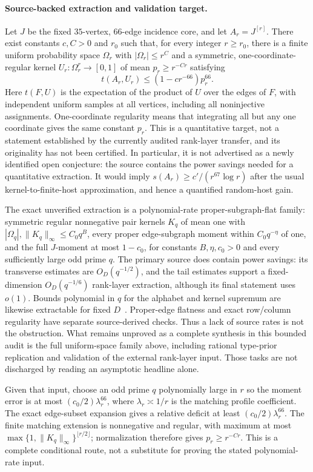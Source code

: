 \paragraph{Source-backed extraction and validation target.}
Let $J$ be the fixed $35$-vertex, $66$-edge incidence core, and let
$A_r=J^{[r]}$. There exist constants $c,C>0$ and $r_0$ such that, for every
integer $r\ge r_0$, there is a finite uniform probability space $\Omega_r$
with $|\Omega_r|\le r^C$ and a symmetric, one-coordinate-regular kernel
$U_r:\Omega_r^r\to[0,1]$ of mean $p_r\ge r^{-Cr}$ satisfying
\[
t(A_r,U_r)\le(1-c r^{-66})p_r^{66}.
\]
Here $t(F,U)$ is the expectation of the product of $U$ over the edges of
$F$, with independent uniform samples at all vertices, including all
noninjective assignments. One-coordinate regularity means that integrating
all but any one coordinate gives the same constant $p_r$.
This is a quantitative target, not a statement established by the currently
audited rank-layer transfer, and its originality has not been certified.
In particular, it is not advertised as a newly identified open conjecture:
the source contains the power savings needed for a quantitative extraction.
It would imply $s(A_r)\ge c'/(r^{67}\log r)$ after the usual kernel-to-finite-host
approximation, and hence a quantified random-host gain.

The exact unverified extraction is a polynomial-rate proper-subgraph-flat
family: symmetric regular nonnegative pair kernels $K_q$ of mean one with
$|\Omega_q|,\|K_q\|_\infty\le C_0q^B$, every proper edge-subgraph moment
within $C_0q^{-\eta}$ of one, and the full $J$-moment at most $1-c_0$,
for constants $B,\eta,c_0>0$ and every sufficiently large odd prime $q$.
The primary source does contain power savings: its transverse estimates are
$O_D(q^{-1/2})$, and the tail estimates support a fixed-dimension
$O_D(q^{-1/6})$ rank-layer extraction, although its final statement uses
$o(1)$. Bounds polynomial in $q$ for the alphabet and kernel supremum are
likewise extractable for fixed $D$~\citep{openai161}. Proper-edge flatness
and exact row/column regularity have separate source-derived checks.
Thus a lack of source rates is not the obstruction. What remains unproved
as a complete synthesis in this bounded audit is the full uniform-space
family above, including rational type-prior replication and validation of
the external rank-layer input. Those tasks are not discharged by reading
an asymptotic headline alone.

Given that input, choose an odd prime $q$ polynomially large in $r$ so the moment error
is at most $(c_0/2)\lambda_r^{66}$, where $\lambda_r\asymp1/r$ is the matching
profile coefficient. The exact edge-subset expansion gives a relative
deficit at least $(c_0/2)\lambda_r^{66}$. The finite matching extension is
nonnegative and regular, with maximum at most
$\max\{1,\|K_q\|_\infty\}^{\lfloor r/2\rfloor}$; normalization therefore
gives $p_r\ge r^{-Cr}$. This is a complete conditional route, not a substitute
for proving the stated polynomial-rate input.

